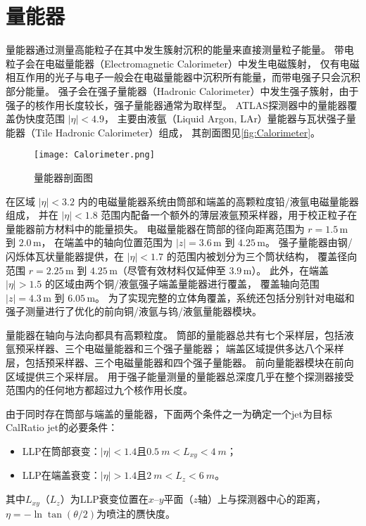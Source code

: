 \section{量能器}
量能器通过测量高能粒子在其中发生簇射沉积的能量来直接测量粒子能量。
带电粒子会在电磁量能器（Electromagnetic Calorimeter）中发生电磁簇射，
仅有电磁相互作用的光子与电子一般会在电磁量能器中沉积所有能量，而带电强子只会沉积部分能量。
强子会在强子量能器（Hadronic Calorimeter）中发生强子簇射，由于强子的核作用长度较长，强子量能器通常为取样型。
ATLAS探测器中的量能器覆盖伪快度范围 \( |\eta| < 4.9 \)，
主要由液氩（Liquid Argon, LAr）量能器与瓦状强子量能器（Tile Hadronic Calorimeter）组成，
其剖面图见\autoref{fig:Calorimeter}。

\begin{figure}[ht]
    \centering
    \texttt{[image: Calorimeter.png]}
    \caption{量能器剖面图}
    \label{fig:Calorimeter}
\end{figure}

在区域 \( |\eta| < 3.2 \) 内的电磁量能器系统由筒部和端盖的高颗粒度铅/液氩电磁量能器组成，
并在 \( |\eta| < 1.8 \) 范围内配备一个额外的薄层液氩预采样器，用于校正粒子在量能器前方材料中的能量损失。
电磁量能器在筒部的径向距离范围为 \( r = 1.5\,\text{m} \) 到 \( 2.0\,\text{m} \)，
在端盖中的轴向位置范围为 \( |z| = 3.6\,\text{m} \) 到 \( 4.25\,\text{m} \)。
强子量能器由钢/闪烁体瓦状量能器提供，在 \( |\eta| < 1.7 \) 的范围内被划分为三个筒状结构，
覆盖径向范围 \( r = 2.25\,\text{m} \) 到 \( 4.25\,\text{m} \)（尽管有效材料仅延伸至 \( 3.9\,\text{m} \)）。
此外，在端盖 \( |\eta| > 1.5 \) 的区域由两个铜/液氩强子端盖量能器进行覆盖，
覆盖轴向范围 \( |z| = 4.3\,\text{m} \) 到 \( 6.05\,\text{m} \)。
为了实现完整的立体角覆盖，系统还包括分别针对电磁和强子测量进行了优化的前向铜/液氩与钨/液氩量能器模块。

量能器在轴向与法向都具有高颗粒度。
筒部的量能器总共有七个采样层，包括液氩预采样器、三个电磁量能器和三个强子量能器；
端盖区域提供多达八个采样层，包括预采样器、三个电磁量能器和四个强子量能器。
前向量能器模块在前向区域提供三个采样层。
用于强子能量测量的量能器总深度几乎在整个探测器接受范围内的任何地方都超过九个核作用长度。

由于同时存在筒部与端盖的量能器，下面两个条件之一为确定一个jet为目标CalRatio jet的必要条件：
\begin{itemize}
    \item LLP在筒部衰变：$|\eta|<1.4$且$\SI{0.5}{m}<L_{xy}<\SI{4}{m}$；
    \item LLP在端盖衰变：$|\eta|>1.4$且$\SI{2}{m}<L_{z}<\SI{6}{m}$。
\end{itemize}
其中$L_{xy}$（$L_{z}$）为LLP衰变位置在$x$--$y$平面（$z$轴）上与探测器中心的距离，
$\eta=-\ln \tan ({\theta}/{2})$为喷注的赝快度。

